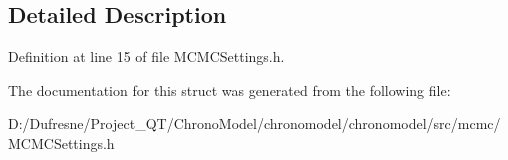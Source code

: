 \subsection{Detailed Description}


Definition at line 15 of file M\-C\-M\-C\-Settings.\-h.



The documentation for this struct was generated from the following file\-:\begin{DoxyCompactItemize}
\item 
D\-:/\-Dufresne/\-Project\-\_\-\-Q\-T/\-Chrono\-Model/chronomodel/chronomodel/src/mcmc/M\-C\-M\-C\-Settings.\-h\end{DoxyCompactItemize}
